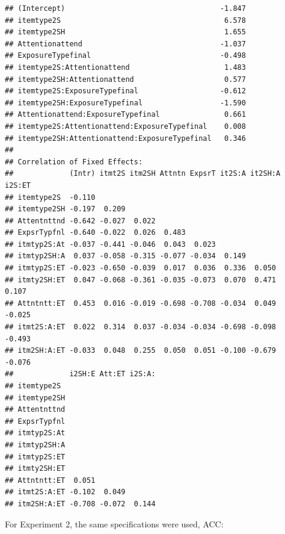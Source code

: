 \documentclass[11pt]{article}\usepackage[]{graphicx}\usepackage[]{color}
\makeatletter
\newenvironment{kframe}{%
 \def\at@end@of@kframe{}%
 \ifinner\ifhmode%
  \def\at@end@of@kframe{\end{minipage}}%
  \begin{minipage}{\columnwidth}%
 \fi\fi%
 \def\FrameCommand##1{\hskip\@totalleftmargin \hskip-\fboxsep
 \colorbox{shadecolor}{##1}\hskip-\fboxsep
     \hskip-\linewidth \hskip-\@totalleftmargin \hskip\columnwidth}%
 \MakeFramed {\advance\hsize-\width
   \@totalleftmargin\z@ \linewidth\hsize
   \@setminipage}}%
 {\par\unskip\endMakeFramed%
 \at@end@of@kframe}
\newenvironment{knitrout}{}{} %
\makeatother
\begin{document}
\begin{knitrout}
\begin{kframe}
\begin{verbatim}
## (Intercept)                                    -1.847
## itemtype2S                                      6.578
## itemtype2SH                                     1.655
## Attentionattend                                -1.037
## ExposureTypefinal                              -0.498
## itemtype2S:Attentionattend                      1.483
## itemtype2SH:Attentionattend                     0.577
## itemtype2S:ExposureTypefinal                   -0.612
## itemtype2SH:ExposureTypefinal                  -1.590
## Attentionattend:ExposureTypefinal               0.661
## itemtype2S:Attentionattend:ExposureTypefinal    0.008
## itemtype2SH:Attentionattend:ExposureTypefinal   0.346
## 
## Correlation of Fixed Effects:
##             (Intr) itmt2S itm2SH Attntn ExpsrT it2S:A it2SH:A i2S:ET
## itemtype2S  -0.110                                                  
## itemtype2SH -0.197  0.209                                           
## Attentnttnd -0.642 -0.027  0.022                                    
## ExpsrTypfnl -0.640 -0.022  0.026  0.483                             
## itmtyp2S:At -0.037 -0.441 -0.046  0.043  0.023                      
## itmtyp2SH:A  0.037 -0.058 -0.315 -0.077 -0.034  0.149               
## itmtyp2S:ET -0.023 -0.650 -0.039  0.017  0.036  0.336  0.050        
## itmty2SH:ET  0.047 -0.068 -0.361 -0.035 -0.073  0.070  0.471   0.107
## Attntntt:ET  0.453  0.016 -0.019 -0.698 -0.708 -0.034  0.049  -0.025
## itmt2S:A:ET  0.022  0.314  0.037 -0.034 -0.034 -0.698 -0.098  -0.493
## itm2SH:A:ET -0.033  0.048  0.255  0.050  0.051 -0.100 -0.679  -0.076
##             i2SH:E Att:ET i2S:A:
## itemtype2S                      
## itemtype2SH                     
## Attentnttnd                     
## ExpsrTypfnl                     
## itmtyp2S:At                     
## itmtyp2SH:A                     
## itmtyp2S:ET                     
## itmty2SH:ET                     
## Attntntt:ET  0.051              
## itmt2S:A:ET -0.102  0.049       
## itm2SH:A:ET -0.708 -0.072  0.144
\end{verbatim}
\end{kframe}
\end{knitrout}

For Experiment 2, the same specifications were used, ACC:
\end{document}
